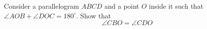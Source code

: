 Consider a parallelogram $ABCD$ and a point $O$ inside it such that
$\angle AOB + \angle DOC = 180^\circ$. Show that	
$$\angle CBO = \angle CDO$$